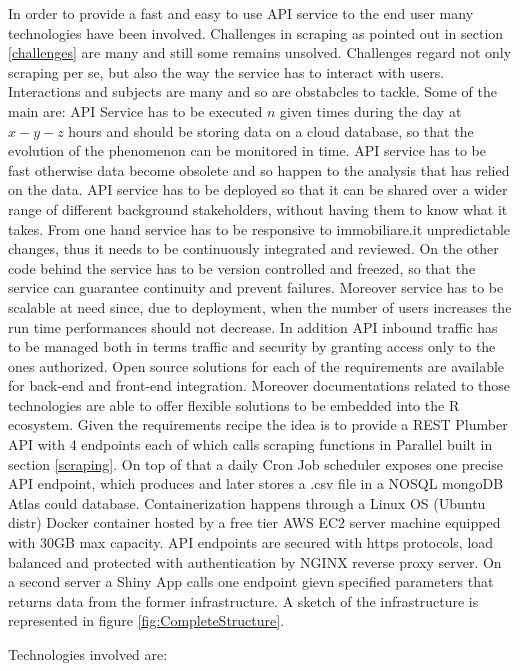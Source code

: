 \documentclass[
  12pt,
  a4paper,
  oneside]{book}
\theoremstyle{definition}
\theoremstyle{definition}
\theoremstyle{definition}
\theoremstyle{remark}
\begin{document}
In order to provide a fast and easy to use API service to the end user many technologies have been involved. Challenges in scraping as pointed out in section \ref{challenges} are many and still some remains unsolved. Challenges regard not only scraping per se, but also the way the service has to interact with users. Interactions and subjects are many and so are obstabcles to tackle. Some of the main are:
API Service has to be executed \(n\) given times during the day at \(x-y-z\) hours and should be storing data on a cloud database, so that the evolution of the phenomenon can be monitored in time.
API service has to be fast otherwise data become obsolete and so happen to the analysis that has relied on the data.
API service has to be deployed so that it can be shared over a wider range of different background stakeholders, without having them to know what it takes. From one hand service has to be responsive to immobiliare.it unpredictable changes, thus it needs to be continuously integrated and reviewed. On the other code behind the service has to be version controlled and freezed, so that the service can guarantee continuity and prevent failures. Moreover service has to be scalable at need since, due to deployment, when the number of users increases the run time performances should not decrease. In addition API inbound traffic has to be managed both in terms traffic and security by granting access only to the ones authorized.
Open source solutions for each of the requirements are available for back-end and front-end integration. Moreover documentations related to those technologies are able to offer flexible solutions to be embedded into the R ecosystem.
Given the requirements recipe the idea is to provide a REST Plumber API with 4 endpoints each of which calls scraping functions in Parallel built in section \ref{scraping}. On top of that a daily Cron Job scheduler exposes one precise API endpoint, which produces and later stores a .csv file in a NOSQL mongoDB Atlas could database. Containerization happens through a Linux OS (Ubuntu distr) Docker container hosted by a free tier AWS EC2 server machine equipped with 30GB max capacity. API endpoints are secured with https protocols, load balanced and protected with authentication by NGINX reverse proxy server. On a second server a Shiny App calls one endpoint gievn specified parameters that returns data from the former infrastructure. A sketch of the infrastructure is represented in figure \ref{fig:CompleteStructure}.

Technologies involved are:
\end{document}
